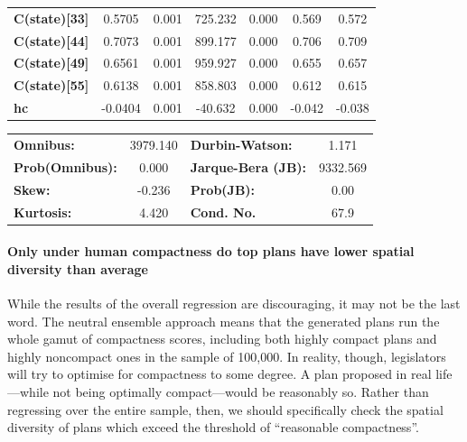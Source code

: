 \documentclass[]{article}
\let\oldparagraph\paragraph
\renewcommand{\paragraph}[1]{\oldparagraph{#1}\mbox{}}
\begin{document}
\begin{table}[h!]
\begin{center}
\begin{tabular}{lcccccc}
\textbf{C(state)[33]} &       0.5705  &        0.001     &   725.232  &         0.000        &        0.569    &        0.572     \\
\textbf{C(state)[44]} &       0.7073  &        0.001     &   899.177  &         0.000        &        0.706    &        0.709     \\
\textbf{C(state)[49]} &       0.6561  &        0.001     &   959.927  &         0.000        &        0.655    &        0.657     \\
\textbf{C(state)[55]} &       0.6138  &        0.001     &   858.803  &         0.000        &        0.612    &        0.615     \\
\textbf{hc}           &      -0.0404  &        0.001     &   -40.632  &         0.000        &       -0.042    &       -0.038     \\
\bottomrule
\end{tabular}
\begin{tabular}{lclc}
\textbf{Omnibus:}       & 3979.140 & \textbf{  Durbin-Watson:     } &    1.171  \\
\textbf{Prob(Omnibus):} &   0.000  & \textbf{  Jarque-Bera (JB):  } & 9332.569  \\
\textbf{Skew:}          &  -0.236  & \textbf{  Prob(JB):          } &     0.00  \\
\textbf{Kurtosis:}      &   4.420  & \textbf{  Cond. No.          } &     67.9  \\
\bottomrule
\end{tabular}
\end{center}
\end{table}

\hypertarget{only-under-human-compactness-do-top-plans-have-lower-spatial-diversity-than-average}{%
\paragraph{Only under human compactness do top plans have lower spatial
diversity than
average}\label{only-under-human-compactness-do-top-plans-have-lower-spatial-diversity-than-average}}

While the results of the overall regression are discouraging, it may not
be the last word. The neutral ensemble approach means that the generated
plans run the whole gamut of compactness scores, including both highly
compact plans and highly noncompact ones in the sample of 100,000. In
reality, though, legislators will try to optimise for compactness to
some degree. A plan proposed in real life---while not being optimally
compact---would be reasonably so. Rather than regressing over the entire
sample, then, we should specifically check the spatial diversity of
plans which exceed the threshold of ``reasonable compactness''.
\end{document}
